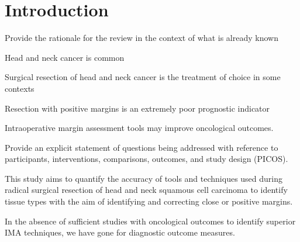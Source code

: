 \section{Introduction}


Provide the rationale for the review in the context of what is already known

Head and neck cancer is common

Surgical resection of head and neck cancer is the treatment of choice in some contexts

Resection with positive margins is an extremely poor prognostic indicator

Intraoperative margin assessment tools may improve oncological outcomes.



Provide an explicit statement of questions being addressed with reference to participants, interventions, comparisons, outcomes, and study design (PICOS). 

This study aims to quantify the accuracy of tools and techniques used during radical surgical resection of head and neck squamous cell carcinoma to identify tissue types with the aim of identifying and correcting close or positive margins.


In the absence of sufficient studies with oncological outcomes to identify superior IMA techniques, we have gone for diagnostic outcome measures.
